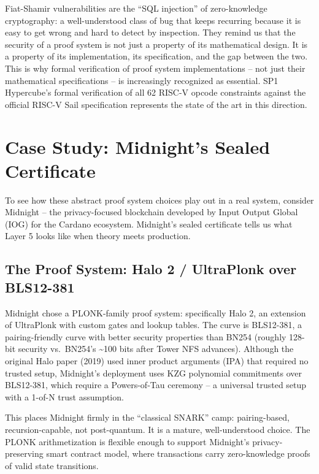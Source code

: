 \documentclass[
  11pt,
  openany]{report}
\begin{document}
Fiat-Shamir vulnerabilities are the ``SQL injection'' of zero-knowledge
cryptography: a well-understood class of bug that keeps recurring because it is
easy to get wrong and hard to detect by inspection. They remind us that the
security of a proof system is not just a property of its mathematical design. It
is a property of its implementation, its specification, and the gap between the
two. This is why formal verification of proof system implementations -- not just
their mathematical specifications -- is increasingly recognized as essential.
SP1 Hypercube's formal verification of all 62 RISC-V opcode constraints against
the official RISC-V Sail specification represents the state of the art in this
direction.

\section{Case Study: Midnight's Sealed
Certificate}\label{case-study-midnights-sealed-certificate}

To see how these abstract proof system choices play out in a real system,
consider Midnight -- the privacy-focused blockchain developed by Input Output
Global (IOG) for the Cardano ecosystem. Midnight's sealed certificate tells us
what Layer 5 looks like when theory meets production.

\subsection{The Proof System: Halo 2 / UltraPlonk over
BLS12-381}\label{the-proof-system-halo-2-ultraplonk-over-bls12-381}

Midnight chose a PLONK-family proof system: specifically Halo 2, an extension of
UltraPlonk with custom gates and lookup tables. The curve is BLS12-381, a
pairing-friendly curve with better security properties than BN254 (roughly
128-bit security vs.~BN254's \textasciitilde100 bits after Tower NFS advances).
Although the original Halo paper (2019) used inner product arguments (IPA) that
required no trusted setup, Midnight's deployment uses KZG polynomial commitments
over BLS12-381, which require a Powers-of-Tau ceremony -- a universal trusted
setup with a 1-of-N trust assumption.

This places Midnight firmly in the ``classical SNARK'' camp: pairing-based,
recursion-capable, not post-quantum. It is a mature, well-understood choice. The
PLONK arithmetization is flexible enough to support Midnight's
privacy-preserving smart contract model, where transactions carry zero-knowledge
proofs of valid state transitions.
\end{document}
